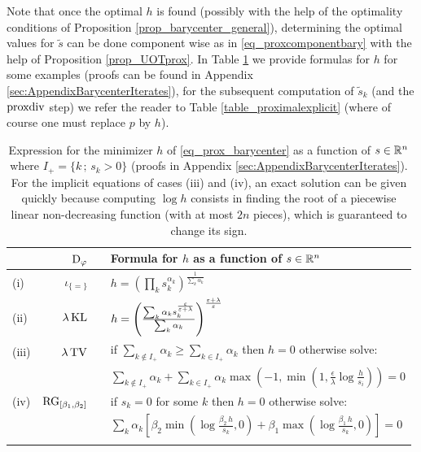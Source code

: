 %
Note that once the optimal $h$ is found (possibly with the help of the optimality conditions of Proposition \ref{prop_barycenter_general}), determining the optimal values for $\tilde{s}$ can be done component wise as in \eqref{eq_proxcomponentbary} with the help of Proposition \ref{prop_UOTprox}.
%
In Table \ref{prop_estimatebary} we provide formulas for $h$ for some examples (proofs can be found in Appendix \ref{sec:AppendixBarycenterIterates}), for the subsequent computation of $\tilde{s}_k$ (and the $\operatorname{proxdiv}$ step) we refer the reader to Table \ref{table_proximalexplicit} (where of course one must replace $p$ by $h$).
%
%
%
%
\begin{table}[h] \centering
\begin{tabular}{@{}lrcl@{}}\toprule
&$\operatorname{D}_\varphi$ && Formula for $h$ as a function of $s\in \mathbb{R}^n$ \\ \midrule \addlinespace 
(i)&$ \iota_{\{=\}} $
&&$h= \left( \prod_k s_k^{\alpha_k} \right)^{\frac{1}{\sum_k \alpha_k}}$
\\ \addlinespace \addlinespace 
(ii)&$\lambda \operatorname{KL}  $
&&  $h = \left( \frac{\sum_k \alpha_k s_k^{\frac{\varepsilon}{\varepsilon+\lambda}} }{\sum_k \alpha_k} \right)^{\frac{\varepsilon + \lambda}{\varepsilon}}$
\\ \addlinespace \addlinespace 
(iii)&$\lambda \operatorname{TV}$
&& if $\sum_{k\notin I_+} \alpha_k \geq \sum_{k\in I_+} \alpha_k $ then $h=0$ otherwise solve:\\ \addlinespace
&&& $\sum_{k\notin I_+} \alpha_k+ \sum_{k\in I_+}\alpha_k \max \left( -1 , \min \left( 1 , \frac{\epsilon}{\lambda } \log \frac{h}{s_i}\right) \right) = 0$
\\ \addlinespace \addlinespace
(iv)&$ \operatorname{RG}_{[\beta_1,\beta_2]} $
&&  if $s_k=0$ for some $k$ then $h=0$ otherwise solve:\\ \addlinespace
&&&$\sum_k \alpha_k \left[ \beta_2 \min\left( \log \frac{\beta_2\, h}{s_k} ,0 \right) + \beta_1 \max \left( \log \frac{\beta_1\, h}{s_k} ,0\right) \right] =0$
\\ \addlinespace \addlinespace \bottomrule
\end{tabular}
\caption{Expression for the minimizer $h$ of \eqref{eq_prox_barycenter} as a function of $s\in \mathbb{R}^n$ where $I_+ = \{k \, ; \, s_k>0 \}$ (proofs in Appendix \ref{sec:AppendixBarycenterIterates}). For the implicit equations of cases (iii) and (iv), an exact solution can be given quickly because computing $\log h$ consists in finding the root of a piecewise linear non-decreasing function (with at most $2n$ pieces), which is guaranteed to change its sign.}
\label{prop_estimatebary}
\end{table}

